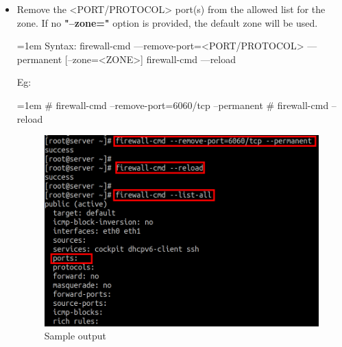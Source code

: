 \begin{flushleft}
\begin{itemize}
		\newpage
		\item Remove the <PORT/PROTOCOL> port(s) from the allowed list for the zone. If no \textbf{"--zone="} option is provided, the default zone will be used.
		\bigskip
		\begin{tcolorbox}[breakable,notitle,boxrule=1pt,colback=pink,colframe=pink]
			\color{black}
			\font=1em
			Syntax: 
			\newline
			firewall-cmd ---remove-port=<PORT/PROTOCOL> ---permanent [--zone=<ZONE>]
			\newline
			\newline
			firewall-cmd ---reload
			\font=4pt
		\end{tcolorbox}	
		Eg:
		\begin{tcolorbox}[breakable,notitle,boxrule=-0pt,colback=black,colframe=black]
			\color{green}
			\font=1em
			\# firewall-cmd --remove-port=6060/tcp --permanent 
			\newline
			\# firewall-cmd --reload
			\font=4pt
		\end{tcolorbox}
		\begin{figure}[h!]
			\centering
			\includegraphics[scale=0.4]{content/chapter2/images/zones9.png}
			\caption{Sample output}
			\label{fig:zones9}
		\end{figure}
			
		
		
	\end{itemize}
	
\end{flushleft}
\newpage
